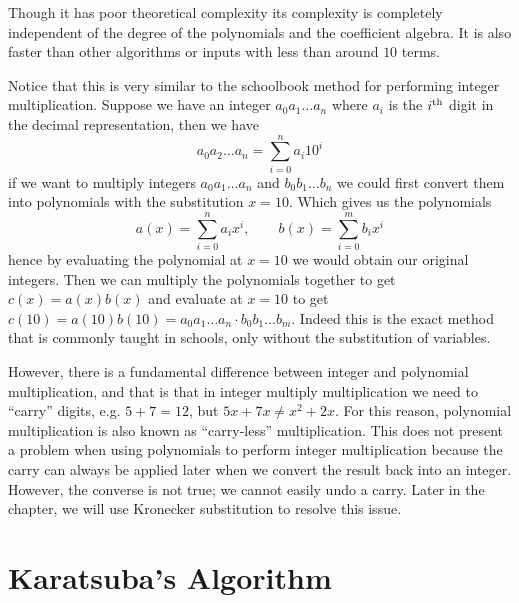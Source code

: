 Though it has poor theoretical complexity its complexity is completely independent of the degree of the polynomials and the coefficient algebra. It is also faster than other algorithms or inputs with less than around $10$ terms.

Notice that this is very similar to the schoolbook method for performing integer multiplication. Suppose we have an integer $a_0a_1 \ldots a_n$ where $a_i$ is the $i^\textrm{th}$ digit in the decimal representation, then we have
\[
    a_0a_2 \ldots a_n = \sum^n_{i=0} a_i 10^i
\]
if we want to multiply integers $a_0a_1\ldots a_n$ and $b_0b_1\ldots b_n$ we could first convert them into polynomials with the substitution $x = 10$. Which gives us the polynomials
\[
    a(x) = \sum^n_{i=0} a_ix^i, \qquad b(x) = \sum^m_{i=0} b_ix^i
\]
hence by evaluating the polynomial at $x = 10$ we would obtain our original integers. Then we can multiply the polynomials together to get $c(x) = a(x)b(x)$ and evaluate at $x = 10$ to get $c(10) = a(10)b(10) = a_0a_1\ldots a_n \cdot b_0b_1\ldots b_m$. Indeed this is the exact method that is commonly taught in schools, only without the substitution of variables.

However, there is a fundamental difference between integer and polynomial multiplication, and that is that in integer multiply multiplication we need to ``carry'' digits, e.g. $5 + 7 = 12$, but $5x + 7x \neq x^2 + 2x$. For this reason, polynomial multiplication is also known as ``carry-less'' multiplication. This does not present a problem when using polynomials to perform integer multiplication because the carry can always be applied later when we convert the result back into an integer. However, the converse is not true; we cannot easily undo a carry. Later in the chapter, we will use Kronecker substitution to resolve this issue.

\section{Karatsuba's Algorithm}
\label{sec:prelim-karatsuba}

